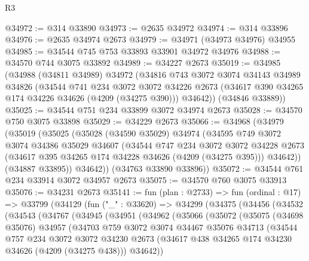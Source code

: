 \begin{lexlean}{R3}
\begin{coremodule}
@34972 := @314 @33890
@34973 := @2635 @34972
@34974 := @314 @33896
@34976 := @2635 @34974 @2673
@34979 := @34971 (@34973 @34976) @34955
@34985 := @34544 @745 @753 @33893 @33901 @34972 @34976
@34988 := @34570 @744 @3075 @33892
@34989 := @34227 @2673
@35019 := @34985
    (@34988
      (@34811 @34989)
      @34972
      (@34816
        @743
        @3072
        @3074
        @34143
        @34989
        @34826
        (@34544
          @741
          @234
          @3072
          @3072
          @34226
          @2673
          (@34617 @390 @34265 @174 @34226 @34626 (@4209 (@34275 @390)))
          @34642))
      (@34846 @33889))
@35025 := @34544 @751 @234 @33899 @3072 @34974 @2673
@35028 := @34570 @750 @3075 @33898
@35029 := @34229 @2673
@35066 := @34968
    (@34979
      (@35019
        (@35025
          (@35028
            (@34590 @35029)
            @34974
            (@34595
              @749
              @3072
              @3074
              @34386
              @35029
              @34607
              (@34544
                @747
                @234
                @3072
                @3072
                @34228
                @2673
                (@34617 @395 @34265 @174 @34228 @34626 (@4209 (@34275 @395)))
                @34642))
            (@34887 @33895))
          @34642))
      (@34763 @33890 @33896))
@35072 := @34544 @761 @234 @33914 @3072 @34957 @2673
@35075 := @34570 @760 @3075 @33913
@35076 := @34231 @2673
@35141 := fun (plan : @2733) =>
  fun (ordinal : @17) =>
  @33799
    (@34129
      (fun ("_" : @33620) =>
      @34299
        (@34375
          (@34456
            (@34532
              (@34543
                (@34767
                  (@34945
                    (@34951
                      (@34962
                        (@35066
                          (@35072
                            (@35075
                              (@34698 @35076)
                              @34957
                              (@34703
                                @759
                                @3072
                                @3074
                                @34467
                                @35076
                                @34713
                                (@34544
                                  @757
                                  @234
                                  @3072
                                  @3072
                                  @34230
                                  @2673
                                  (@34617 @438 @34265 @174 @34230 @34626 (@4209 (@34275 @438)))
                                  @34642))

\end{coremodule}
\end{lexlean}
